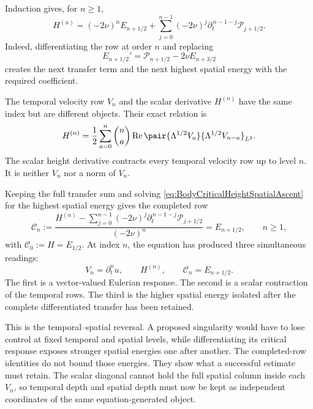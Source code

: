 Induction gives, for \(n\geq1\),
\begin{equation}\label{eq:BodyCriticalHeightSpatialAscent}
  H^{(n)}
  =(-2\nu)^nE_{n+1/2}
  +\sum_{j=0}^{n-1}
  (-2\nu)^j
  \partial_t^{\,n-1-j}\mathcal P_{j+1/2}.
\end{equation}
Indeed, differentiating the row at order \(n\) and replacing
\[
  E_{n+1/2}'
  =\mathcal P_{n+1/2}-2\nu E_{n+3/2}
\]
creates the next transfer term and the next highest spatial energy with the required coefficient.

The temporal velocity row \(V_n\) and the scalar derivative \(H^{(n)}\) have the same index but are different objects.
Their exact relation is
\begin{equation}\label{eq:BodyHeightDerivativeVelocityContraction}
  H^{(n)}
  =\frac12\sum_{a=0}^{n}\binom{n}{a}
  \operatorname{Re}
  \pair{\Lambda^{1/2}V_a}{\Lambda^{1/2}V_{n-a}}_{L^2}.
\end{equation}
The scalar height derivative contracts every temporal velocity row up to level \(n\).
It is neither \(V_n\) nor a norm of \(V_n\).

Keeping the full transfer sum and solving \eqref{eq:BodyCriticalHeightSpatialAscent} for the highest spatial energy gives the completed row
\begin{equation}\label{eq:BodyCompletedCriticalRow}
  \mathscr C_n
  :=
  \frac{
    H^{(n)}
    -\displaystyle\sum_{j=0}^{n-1}
    (-2\nu)^j
    \partial_t^{\,n-1-j}\mathcal P_{j+1/2}
  }{(-2\nu)^n}
  =E_{n+1/2},
  \qquad n\geq1,
\end{equation}
with \(\mathscr C_0:=H=E_{1/2}\).
At index \(n\), the equation has produced three simultaneous readings:
\[
  V_n=\partial_t^nu,
  \qquad
  H^{(n)},
  \qquad
  \mathscr C_n=E_{n+1/2}.
\]
The first is a vector-valued Eulerian response.
The second is a scalar contraction of the temporal rows.
The third is the higher spatial energy isolated after the complete differentiated transfer has been retained.

This is the temporal--spatial reversal.
A proposed singularity would have to lose control at fixed temporal and spatial levels, while differentiating its critical response exposes stronger spatial energies one after another.
The completed-row identities do not bound those energies.
They show what a successful estimate must retain.
The scalar diagonal cannot hold the full spatial column inside each \(V_n\), so temporal depth and spatial depth must now be kept as independent coordinates of the same equation-generated object.
